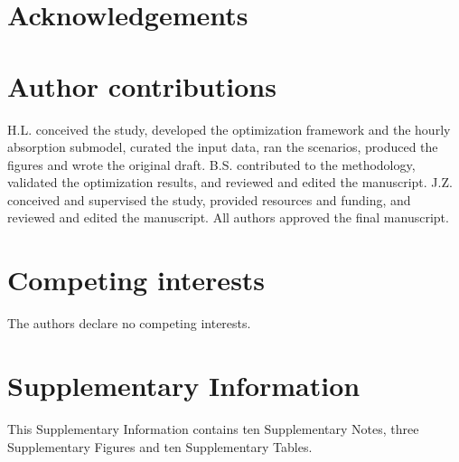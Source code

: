 \documentclass[sn-vancouver,Numbered]{sn-jnl}%
\begin{document}
\section*{Acknowledgements}

\section*{Author contributions}
H.L. conceived the study, developed the optimization framework and the hourly absorption submodel, curated the input data, ran the scenarios, produced the figures and wrote the original draft. B.S. contributed to the methodology, validated the optimization results, and reviewed and edited the manuscript. J.Z. conceived and supervised the study, provided resources and funding, and reviewed and edited the manuscript. All authors approved the final manuscript.

\section*{Competing interests}
The authors declare no competing interests.




\clearpage
\setcounter{section}{0}
\renewcommand{\thesection}{S\arabic{section}}
\renewcommand{\thesubsection}{S\arabic{section}.\arabic{subsection}}
\renewcommand{\thefigure}{S\arabic{figure}}\setcounter{figure}{0}
\renewcommand{\thetable}{S\arabic{table}}\setcounter{table}{0}
\renewcommand{\theequation}{S\arabic{equation}}\setcounter{equation}{0}
\renewcommand{\theHsection}{S\arabic{section}}
\renewcommand{\theHsubsection}{S\arabic{section}.\arabic{subsection}}
\renewcommand{\theHfigure}{S\arabic{figure}}
\renewcommand{\theHtable}{S\arabic{table}}
\renewcommand{\theHequation}{S\arabic{equation}}

\nolinenumbers
\section*{Supplementary Information}

This Supplementary Information contains ten Supplementary Notes, three Supplementary Figures and ten Supplementary Tables.
\end{document}
